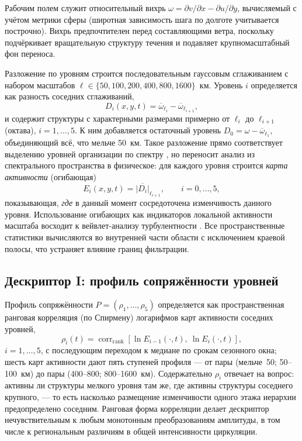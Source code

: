\documentclass[11pt,a4paper]{article}
\begin{document}
Рабочим полем служит относительный вихрь $\omega=\partial v/\partial x-\partial u/\partial y$, вычисляемый с учётом метрики сферы (широтная зависимость шага по долготе учитывается построчно). Вихрь предпочтителен перед составляющими ветра, поскольку подчёркивает вращательную структуру течения и подавляет крупномасштабный фон переноса.

Разложение по уровням строится последовательным гауссовым сглаживанием с набором масштабов $\ell\in\{50,100,200,400,800,1600\}$~км. Уровень $i$ определяется как разность соседних сглаживаний,
\begin{equation}
D_i(x,y,t)=\overline{\omega}_{\ell_i}-\overline{\omega}_{\ell_{i+1}},
\end{equation}
и содержит структуры с характерными размерами примерно от $\ell_i$ до $\ell_{i+1}$ (октава), $i=1,\dots,5$. К ним добавляется остаточный уровень $D_0=\omega-\overline{\omega}_{\ell_1}$, объединяющий всё, что мельче 50~км. Такое разложение прямо соответствует выделению уровней организации по спектру \cite{Krenke2019}, но переносит анализ из спектрального пространства в физическое: для каждого уровня строится \emph{карта активности} (огибающая)
\begin{equation}
E_i(x,y,t)=\overline{\lvert D_i\rvert}_{\ell_{i+1}},\qquad i=0,\dots,5,
\end{equation}
показывающая, \emph{где} в данный момент сосредоточена изменчивость данного уровня. Использование огибающих как индикаторов локальной активности масштаба восходит к вейвлет-анализу турбулентности \cite{Farge1992}. Все пространственные статистики вычисляются во внутренней части области с исключением краевой полосы, что устраняет влияние границ фильтрации.

\subsection{Дескриптор I: профиль сопряжённости уровней}

Профиль сопряжённости $P=(\rho_1,\dots,\rho_5)$ определяется как пространственная ранговая корреляция (по Спирмену) логарифмов карт активности соседних уровней,
\begin{equation}
\rho_i(t)=\operatorname{corr}_{\mathrm{rank}}\!\left[\ln E_{i-1}(\cdot,t),\ \ln E_{i}(\cdot,t)\right],
\label{eq:rho}
\end{equation}
$i=1,\dots,5$, с последующим переходом к медиане по срокам сезонного окна; шесть карт активности дают пять ступеней профиля --- от пары (мельче~50; 50--100~км) до пары (400--800; 800--1600~км). Содержательно $\rho_i$ отвечает на вопрос: активны ли структуры мелкого уровня там же, где активны структуры соседнего крупного, --- то есть насколько размещение изменчивости одного этажа иерархии предопределено соседним. Ранговая форма корреляции делает дескриптор нечувствительным к любым монотонным преобразованиям амплитуды, в том числе к региональным различиям в общей интенсивности циркуляции.
\end{document}
